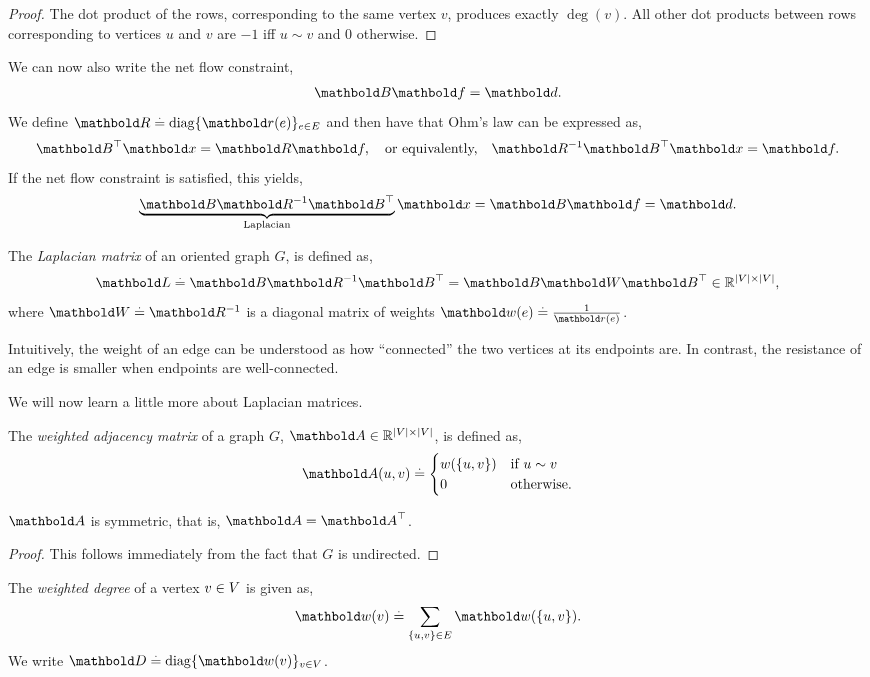 \begin{proof} The dot product of the rows, corresponding to the same vertex $v$, produces exactly $\deg(v)$. All other dot products between rows corresponding to vertices $u$ and $v$ are $-1$ iff $u \sim v$ and $0$ otherwise.
\end{proof}
We can now also write the net flow constraint, \begin{align}
    \mB\vf = \vd.
\end{align} We define $\mR \defeq \diag\{\vr(e)\}_{e \in \sE}$ and then have that Ohm's law can be expressed as, \begin{align}
    \trans{\mB}\vx = \mR\vf, \quad\text{or equivalently,}\quad \mR^{-1}\trans{\mB}\vx = \vf.
\end{align} If the net flow constraint is satisfied, this yields, \begin{align}
    \underbrace{\mB\mR^{-1}\trans{\mB}}_{\text{Laplacian}}\vx = \mB\vf = \vd. \label{eq:ohms_law_and_net_flow_constraint}
\end{align}
\begin{defn}
The \emph{Laplacian matrix} of an oriented graph $G$, is defined as, \begin{align}
    \mL \defeq \mB\mR^{-1}\trans{\mB} = \mB\mW\trans{\mB} \in \R^{|\sV|\times|\sV|},
\end{align} where $\mW \defeq \mR^{-1}$ is a diagonal matrix of weights $\vw(e) \defeq \frac{1}{\vr(e)}$.
\end{defn}\noindent Intuitively, the weight of an edge can be understood as how ``connected'' the two vertices at its endpoints are. In contrast, the resistance of an edge is smaller when endpoints are well-connected.

We will now learn a little more about Laplacian matrices.
\begin{defn}
The \emph{weighted adjacency matrix} of a graph $G$, $\mA \in \R^{|\sV|\times|\sV|}$, is defined as, \begin{align}
    \mA(u, v) \defeq \begin{cases}
        w(\{u,v\}) & \text{if $u \sim v$} \\
        0 & \text{otherwise}.
    \end{cases}
\end{align}
\end{defn}
\begin{lem}
$\mA$ is symmetric, that is, $\mA = \trans{\mA}$.
\end{lem}
\begin{proof}
This follows immediately from the fact that $G$ is undirected.
\end{proof}
\begin{defn}
The \emph{weighted degree} of a vertex $v \in V$ is given as, \begin{align}
    \vw(v) \defeq \sum_{\{u,v\} \in \sE} \vw(\{u,v\}).
\end{align} We write $\mD \defeq \diag\{\vw(v)\}_{v \in \sV}$.
\end{defn}

